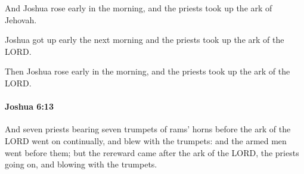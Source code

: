 			\begin{versebox}
					\item[BHS] 
					\item[ASV] And Joshua rose early in the morning, and the priests took up the ark of Jehovah.
					\item[NIV] Joshua got up early the next morning and the priests took up the ark of the LORD.
					\item[NRSV] Then Joshua rose early in the morning, and the priests took up the ark of the LORD.
			\end{versebox}

		\paragraph{Joshua 6:13} %
			\label{JOSHUA-6-13}

			And seven priests bearing seven trumpets of rams’ horns before the ark of the LORD went on continually, and blew with the trumpets: and the armed men went before them; but the rereward came after the ark of the LORD, the priests going on, and blowing with the trumpets.

